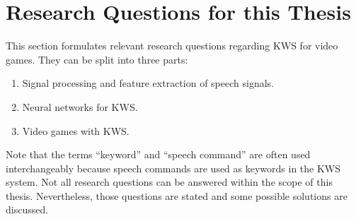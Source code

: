 
\section{Research Questions for this Thesis}\label{sec:intro_rq}
This section formulates relevant research questions regarding KWS for video games.
They can be split into three parts:
\begin{enumerate}[label={Q.\arabic*)}, leftmargin=1.4cm]
  \item Signal processing and feature extraction of speech signals.
  \item Neural networks for KWS.
  \item Video games with KWS.
\end{enumerate}
Note that the terms \enquote{keyword} and \enquote{speech command} are often used interchangeably because speech commands are used as keywords in the KWS system.
Not all research questions can be answered within the scope of this thesis.
Nevertheless, those questions are stated and some possible solutions are discussed.



